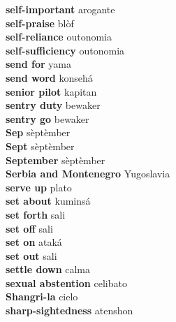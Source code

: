 \textbf{ self-important  } arogante \\
\textbf{ self-praise  } blòf \\
\textbf{ self-reliance  } outonomia \\
\textbf{ self-sufficiency  } outonomia \\
\textbf{ send for  } yama \\
\textbf{ send word  } konsehá \\
\textbf{ senior pilot  } kapitan \\
\textbf{ sentry duty  } bewaker \\
\textbf{ sentry go  } bewaker \\
\textbf{ Sep  } sèptèmber \\
\textbf{ Sept  } sèptèmber \\
\textbf{ September  } sèptèmber \\
\textbf{ Serbia and Montenegro  } Yugoslavia \\
\textbf{ serve up  } plato \\
\textbf{ set about  } kuminsá \\
\textbf{ set forth  } sali \\
\textbf{ set off  } sali \\
\textbf{ set on  } ataká \\
\textbf{ set out  } sali \\
\textbf{ settle down  } calma \\
\textbf{ sexual abstention  } celibato \\
\textbf{ Shangri-la  } cielo \\
\textbf{ sharp-sightedness  } atenshon \\
